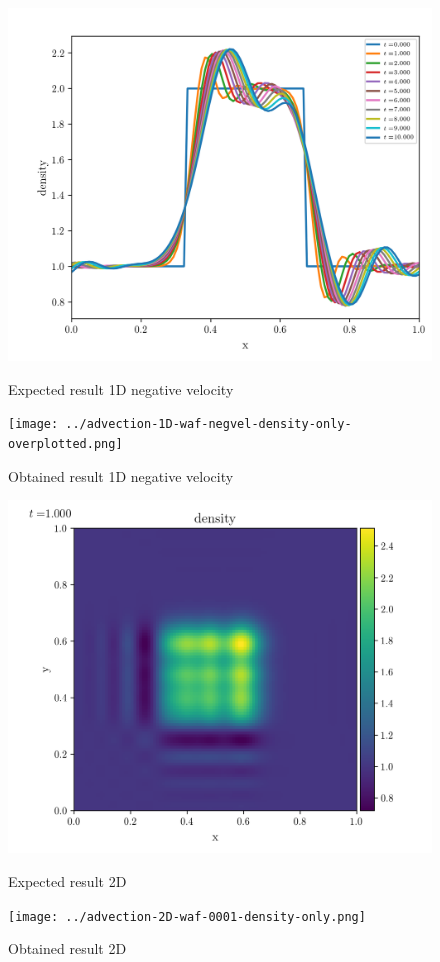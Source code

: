     \begin{figure}[htbp]
        \centering
        \includegraphics[width=.7\textwidth]{./figures/advection-1D-waf-negvel-density-only-overplotted.png}%
        \caption{Expected result 1D negative velocity}
        \texttt{[image: ../advection-1D-waf-negvel-density-only-overplotted.png]}%
        \caption{Obtained result 1D negative velocity}
    \end{figure}

    \begin{figure}[htbp]
        \centering
        \includegraphics[width=.7\textwidth]{./figures/advection-2D-waf-0001-density-only.png}%
        \caption{Expected result 2D}
        \texttt{[image: ../advection-2D-waf-0001-density-only.png]}%
        \caption{Obtained result 2D}
    \end{figure}

